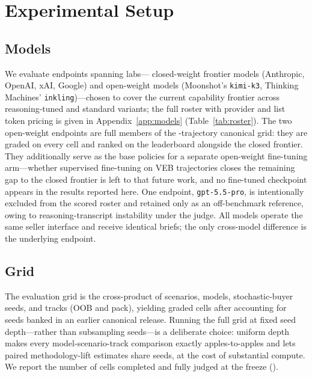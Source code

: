 \section{Experimental Setup}
\label{sec:experiments}

\subsection{Models}
We evaluate \numModels{} endpoints spanning \numLabs{} labs---\numModelsFrontier{}
closed-weight frontier models (Anthropic, OpenAI, xAI, Google) and \numModelsOpen{}
open-weight models (Moonshot's \texttt{kimi-k3}, Thinking Machines'
\texttt{inkling})---chosen to cover the current capability frontier across
reasoning-tuned and standard variants; the full roster with provider and list token
pricing is given in Appendix~\ref{app:models} (Table~\ref{tab:roster}). The two
open-weight endpoints are full members of the \gridCellsTotal{}-trajectory canonical
grid: they are graded on every cell and ranked on the leaderboard alongside the closed
frontier. They additionally serve as the base policies for a separate open-weight
fine-tuning arm---whether supervised fine-tuning on VEB trajectories closes the
remaining gap to the closed frontier is left to that future work, and no fine-tuned
checkpoint appears in the results reported here. One
endpoint, \texttt{gpt-5.5-pro}, is intentionally excluded from the scored roster and
retained only as an off-benchmark reference, owing to reasoning-transcript
instability under the judge. All models operate the same seller interface and receive
identical briefs; the only cross-model difference is the underlying endpoint.

\subsection{Grid}
The evaluation grid is the cross-product of \numScenarios{} scenarios,
\numModels{} models, \numSeeds{} stochastic-buyer seeds, and \numTracks{} tracks
(OOB and pack), yielding \gridCellsTotal{} graded cells after accounting for
seeds banked in an earlier canonical release. Running the full grid at fixed seed
depth---rather than subsampling seeds---is a deliberate choice: uniform depth
makes every model-scenario-track comparison exactly apples-to-apples and lets
paired methodology-lift estimates share seeds, at the cost of substantial compute.
We report the number of cells completed and fully judged at the freeze
(\resCellsComplete{}).

